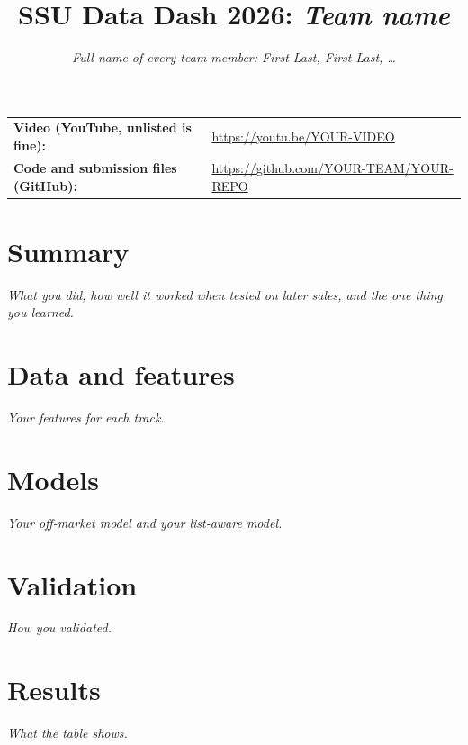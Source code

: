 \documentclass[11pt]{article}
\title{SSU Data Dash 2026: \textit{Team name}}
\author{\textit{Full name of every team member: First Last, First Last, \ldots}}
\date{}
\begin{document}
\maketitle

\noindent\begin{tabular}{@{}ll}
\textbf{Video (YouTube, unlisted is fine):} & \url{https://youtu.be/YOUR-VIDEO} \\
\textbf{Code and submission files (GitHub):} & \url{https://github.com/YOUR-TEAM/YOUR-REPO} \\
\end{tabular}

\section*{Summary}
\textit{What you did, how well it worked when tested on later sales, and the one thing you learned.}

\section{Data and features}
\textit{Your features for each track.}

\section{Models}
\textit{Your off-market model and your list-aware model.}

\section{Validation}
\textit{How you validated.}

\section{Results}
\begin{table}[h]
\centering

\caption{Walk-forward validation on the listings. MdAPE: median absolute percentage error.
MAPE: mean absolute percentage error. Brackets: bootstrap 95\% interval.}
\end{table}
\textit{What the table shows.}
\end{document}
